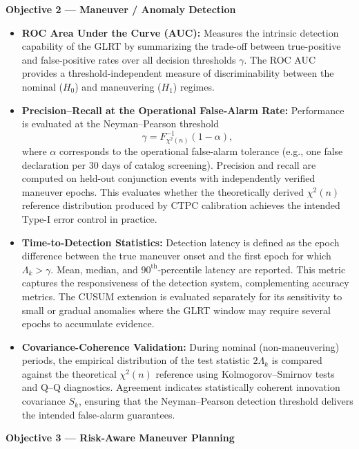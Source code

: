 \documentclass[10pt]{article}
\begin{document}
\textbf{Objective 2 — Maneuver / Anomaly Detection}\label{sec:obj2}

\begin{itemize}

\item \textbf{ROC Area Under the Curve (AUC):}
Measures the intrinsic detection capability of the GLRT by summarizing the trade-off between true-positive and false-positive rates over all decision thresholds $\gamma$. The ROC AUC provides a threshold-independent measure of discriminability between the nominal ($H_0$) and maneuvering ($H_1$) regimes.

\item \textbf{Precision--Recall at the Operational False-Alarm Rate:}
Performance is evaluated at the Neyman--Pearson threshold 
\[
\gamma = F^{-1}_{\chi^2(n)}(1-\alpha),
\]
where $\alpha$ corresponds to the operational false-alarm tolerance (e.g., one false declaration per 30 days of catalog screening). Precision and recall are computed on held-out conjunction events with independently verified maneuver epochs. This evaluates whether the theoretically derived $\chi^2(n)$ reference distribution produced by CTPC calibration achieves the intended Type-I error control in practice.

\item \textbf{Time-to-Detection Statistics:}
Detection latency is defined as the epoch difference between the true maneuver onset and the first epoch for which $\Lambda_k > \gamma$. Mean, median, and $90^{\text{th}}$-percentile latency are reported. This metric captures the responsiveness of the detection system, complementing accuracy metrics. The CUSUM extension is evaluated separately for its sensitivity to small or gradual anomalies where the GLRT window may require several epochs to accumulate evidence.

\item \textbf{Covariance-Coherence Validation:}
During nominal (non-maneuvering) periods, the empirical distribution of the test statistic $2\Lambda_k$ is compared against the theoretical $\chi^2(n)$ reference using Kolmogorov--Smirnov tests and Q--Q diagnostics. Agreement indicates statistically coherent innovation covariance $S_k$, ensuring that the Neyman--Pearson detection threshold delivers the intended false-alarm guarantees.

\end{itemize}

\textbf{Objective 3 — Risk-Aware Maneuver Planning}
\end{document}
